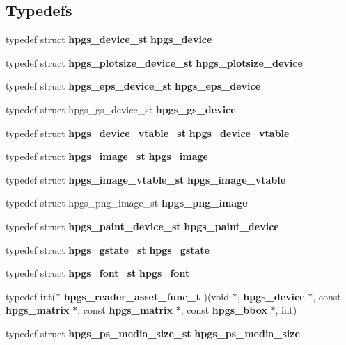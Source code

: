 \subsection*{Typedefs}
\begin{CompactItemize}
\item 
typedef struct {\bf hpgs\_\-device\_\-st} \textbf{hpgs\_\-device}\label{group__device_g100927b1ad4b437d61dddc42708fa8f3}

\item 
typedef struct {\bf hpgs\_\-plotsize\_\-device\_\-st} \textbf{hpgs\_\-plotsize\_\-device}\label{group__device_g98a37f93bf5799c2d55d6e59d9f2c1b1}

\item 
typedef struct {\bf hpgs\_\-eps\_\-device\_\-st} \textbf{hpgs\_\-eps\_\-device}\label{group__device_g648708ea6527d8ffec62f075471c78f9}

\item 
typedef struct hpgs\_\-gs\_\-device\_\-st \textbf{hpgs\_\-gs\_\-device}\label{group__device_g21b6ff6181ec0b14869ddf3aef4fc0e0}

\item 
typedef struct {\bf hpgs\_\-device\_\-vtable\_\-st} \textbf{hpgs\_\-device\_\-vtable}\label{group__device_g503100ff768d14078274b7abe457ac93}

\item 
typedef struct {\bf hpgs\_\-image\_\-st} \textbf{hpgs\_\-image}\label{group__device_ge374b15dff89c5d2c569c4250d4e3a2b}

\item 
typedef struct {\bf hpgs\_\-image\_\-vtable\_\-st} \textbf{hpgs\_\-image\_\-vtable}\label{group__device_g3d673430a5742c7e44d5494bb124d221}

\item 
typedef struct hpgs\_\-png\_\-image\_\-st \textbf{hpgs\_\-png\_\-image}\label{group__device_g73df7e42f65edb523ba4869a4c20155c}

\item 
typedef struct {\bf hpgs\_\-paint\_\-device\_\-st} \textbf{hpgs\_\-paint\_\-device}\label{group__device_g4ca0f0bd51075fb9da27bf731ab5eefd}

\item 
typedef struct {\bf hpgs\_\-gstate\_\-st} \textbf{hpgs\_\-gstate}\label{group__device_g2cbad771732e3c16b8efa41910affdf3}

\item 
typedef struct {\bf hpgs\_\-font\_\-st} \textbf{hpgs\_\-font}\label{group__device_gd67dc54687613dc2af6ca86aa2a61cb3}

\item 
typedef int($\ast$ \textbf{hpgs\_\-reader\_\-asset\_\-func\_\-t} )(void $\ast$, {\bf hpgs\_\-device} $\ast$, const {\bf hpgs\_\-matrix} $\ast$, const {\bf hpgs\_\-matrix} $\ast$, const {\bf hpgs\_\-bbox} $\ast$, int)\label{group__device_gb994453805be117de7c3e23d451b3348}

\item 
typedef struct {\bf hpgs\_\-ps\_\-media\_\-size\_\-st} \textbf{hpgs\_\-ps\_\-media\_\-size}\label{group__device_g9bbe4ba684b8a07c23d89ee820f00574}

\end{CompactItemize}
